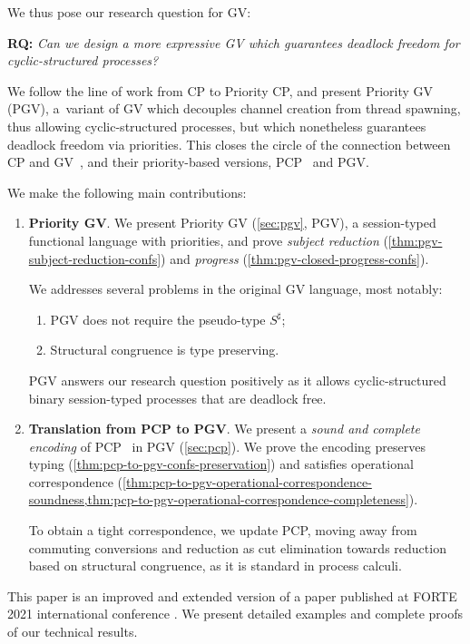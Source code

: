 We thus pose our research question for GV:

\vspace{1em}
  \textbf{RQ:}
  \emph{Can we design a more expressive GV which guarantees deadlock freedom for cyclic-structured processes?}
\vspace{1em}

We follow the line of work from CP to Priority CP, and present Priority GV (PGV), a~variant of GV which decouples channel creation from thread spawning, thus allowing cyclic-structured processes, but which nonetheless guarantees deadlock freedom via priorities. This closes the circle of the connection between CP and GV~\cite{wadler14}, and their priority-based versions, PCP~\cite{dardhagay18extended} and PGV.

We make the following main contributions:
\begin{enumerate}
\item \textbf{Priority GV}. We present Priority GV (\cref{sec:pgv}, PGV), a session-typed functional language with priorities, and prove \emph{subject reduction} (\cref{thm:pgv-subject-reduction-confs}) and \emph{progress} (\cref{thm:pgv-closed-progress-confs}).

We addresses several problems in the original GV language, most notably:
  \begin{enumerate}
  \item PGV does not require the pseudo-type $S^\sharp$;
  \item Structural congruence is type preserving.
  \end{enumerate}
  PGV answers our research question positively as it allows cyclic-structured binary session-typed processes that are deadlock free.
\item \textbf{Translation from PCP to PGV}.
  We present a \emph{sound and complete encoding} of PCP~\cite{dardhagay18extended} in PGV (\cref{sec:pcp}). We prove the encoding preserves typing (\cref{thm:pcp-to-pgv-confs-preservation}) and satisfies operational correspondence (\cref{thm:pcp-to-pgv-operational-correspondence-soundness,thm:pcp-to-pgv-operational-correspondence-completeness}).

  To obtain a tight correspondence, we update PCP, moving away from commuting conversions and reduction as cut elimination towards reduction based on structural congruence, as it is standard in process calculi.
\end{enumerate}

This paper is an improved and extended version of a paper published at FORTE 2021 international conference \cite{kokkedardha21pgv}. We present detailed examples and complete proofs of our technical results.
